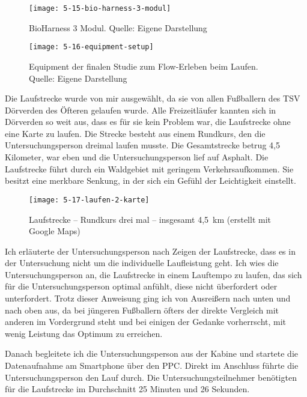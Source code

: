 \begin{figure}[!htb]
	\centering
		\texttt{[image: 5-15-bio-harness-3-modul]}
	\caption[BioHarness 3 Modul]{BioHarness 3 Modul. Quelle: Eigene Darstellung}
	\label{fig:5_15_bio_harness_3_modul}
\end{figure}

\begin{figure}[!htb]
	\centering
		\texttt{[image: 5-16-equipment-setup]}
	\caption[Equipment der finalen Studie zum Flow-Erleben beim Laufen]{Equipment der finalen Studie zum Flow-Erleben beim Laufen. Quelle: Eigene Darstellung}
	\label{fig:5_16_equipment_setup}
\end{figure}

Die Laufstrecke wurde von mir ausgewählt, da sie von allen Fußballern des TSV Dörverden des Öfteren gelaufen wurde. Alle Freizeitläufer kannten sich in Dörverden so weit aus, dass es für sie kein Problem war, die Laufstrecke ohne eine Karte zu laufen. Die Strecke besteht aus einem Rundkurs, den die Untersuchungsperson dreimal laufen musste. Die Gesamtstrecke betrug 4,5 Kilometer, war eben und die Untersuchungsperson lief auf Asphalt. Die Laufstrecke führt durch ein Waldgebiet mit geringem Verkehrsaufkommen. Sie besitzt eine merkbare Senkung, in der sich ein Gefühl der Leichtigkeit einstellt. 

\begin{figure}[!htb]
	\centering
		\texttt{[image: 5-17-laufen-2-karte]}
	\caption[Laufstrecke -- Rundkurs]{Laufstrecke -- Rundkurs drei mal -- insgesamt 4,5~km (erstellt mit Google Maps)}
	\label{fig:5_17_laufen_2_karte}
\end{figure}

Ich erläuterte der Untersuchungsperson nach Zeigen der Laufstrecke, dass es in der Untersuchung nicht um die individuelle Laufleistung geht. Ich wies die Untersuchungsperson an, die Laufstrecke in einem Lauftempo zu laufen, das sich für die Untersuchungsperson optimal anfühlt, diese nicht überfordert oder unterfordert. Trotz dieser Anweisung ging ich von Ausreißern nach unten und nach oben aus, da bei jüngeren Fußballern öfters der direkte Vergleich mit anderen im Vordergrund steht und bei einigen der Gedanke vorherrscht, mit wenig Leistung das Optimum zu erreichen. 

Danach begleitete ich die Untersuchungsperson aus der Kabine und startete die Datenaufnahme am Smartphone über den \ac{PPC}. Direkt im Anschluss führte die Untersuchungsperson den Lauf durch. Die Untersuchungsteilnehmer benötigten für die Laufstrecke im Durchschnitt 25 Minuten und 26 Sekunden. 

